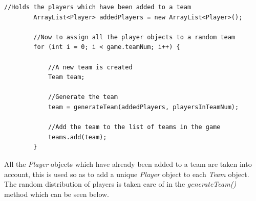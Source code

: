 \documentclass[a4paper,12pt]{extarticle}
\begin{document}
\newpage
\begin{lstlisting}
//Holds the players which have been added to a team
        ArrayList<Player> addedPlayers = new ArrayList<Player>();

        //Now to assign all the player objects to a random team
        for (int i = 0; i < game.teamNum; i++) {

            //A new team is created
            Team team;

            //Generate the team
            team = generateTeam(addedPlayers, playersInTeamNum);

            //Add the team to the list of teams in the game
            teams.add(team);
        }
\end{lstlisting}
\vspace{4mm}

\noindent All the \textit{Player} objects which have already been added to a team are taken into account, this is used so as to add a unique \textit{Player} object to each \textit{Team} object. The random distribution of players is taken care of in the \textit{generateTeam()} method which can be seen below.\\
\end{document}
